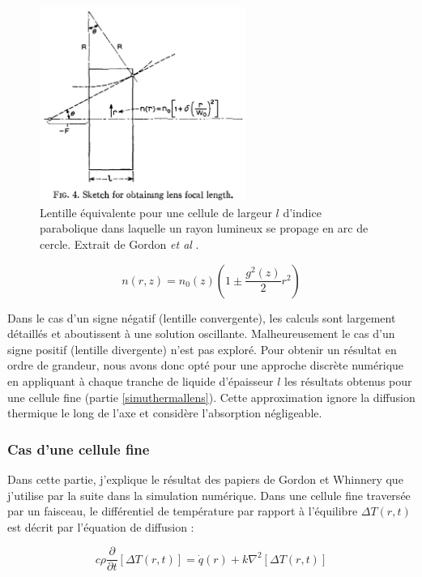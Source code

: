\begin{figure}
\centering
\includegraphics[width=0.6\textwidth]{./files/gordon_lens.png}
\caption{Lentille équivalente pour une cellule de largeur $l$ d'indice parabolique dans laquelle un rayon lumineux se propage en arc de cercle. Extrait de Gordon \emph{et al} \cite{gordon_longtransient_1965}.
\label{FIGgordonlens}}
\end{figure}

$$
n(r,z) = n_0(z) \left( 1 \pm \frac{g^2(z)}{2}r^2\right)
$$

Dans le cas d'un signe négatif (lentille convergente), les calculs sont largement détaillés et aboutissent à une solution oscillante. Malheureusement le cas d'un signe positif (lentille divergente) n'est pas exploré. Pour obtenir un résultat en ordre de grandeur, nous avons donc opté pour une approche discrète numérique en appliquant à chaque tranche de liquide d'épaisseur $l$ les résultats obtenus pour une cellule fine (partie \ref{simuthermallens}). Cette approximation ignore la diffusion thermique le long de l'axe et considère l'absorption négligeable.

\subsubsection{Cas d'une cellule fine}\label{cellulefine}

Dans cette partie, j'explique le résultat des papiers de Gordon et Whinnery que j'utilise par la suite dans la simulation numérique. Dans une cellule fine traversée par un faisceau, le différentiel de température par rapport à l'équilibre $\Delta T(r,t)$ est décrit par l'équation de diffusion :

$$
c\rho\frac{\partial}{\partial t}[\Delta T(r,t)] = \dot{q}(r) + k \nabla^2[\Delta T(r,t)]
$$

